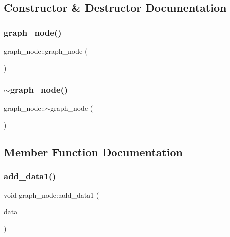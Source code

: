 \subsection{Constructor \& Destructor Documentation}
\mbox{\label{classgraph__node_a1251fd3bbee5992d47fc11afad3834af}} 
\subsubsection{\texorpdfstring{graph\+\_\+node()}{graph\_node()}}
{\footnotesize\ttfamily graph\+\_\+node\+::graph\+\_\+node (\begin{DoxyParamCaption}{ }\end{DoxyParamCaption})}

\mbox{\label{classgraph__node_a178c213234761b36f337a5fc2e2d1305}} 
\subsubsection{\texorpdfstring{$\sim$graph\+\_\+node()}{~graph\_node()}}
{\footnotesize\ttfamily graph\+\_\+node\+::$\sim$graph\+\_\+node (\begin{DoxyParamCaption}{ }\end{DoxyParamCaption})}



\subsection{Member Function Documentation}
\mbox{\label{classgraph__node_a3ee49a31f1c714ad2695575c3c81c450}} 
\subsubsection{\texorpdfstring{add\+\_\+data1()}{add\_data1()}}
{\footnotesize\ttfamily void graph\+\_\+node\+::add\+\_\+data1 (\begin{DoxyParamCaption}\item[{\mbox{\hyperlink{galois_8h_a09fddde158a3a20bd2dcadb609de11dc}{I\+NT}}}]{data }\end{DoxyParamCaption})}

